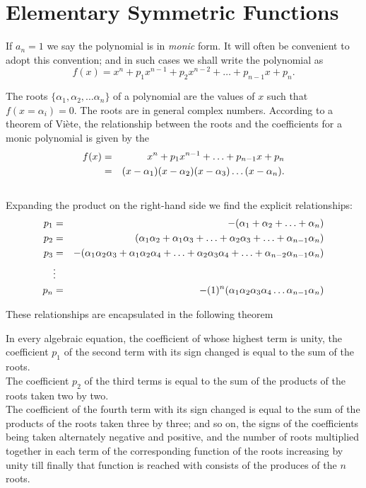 \section{Elementary Symmetric Functions}


If $a_n = 1$ we say the polynomial is in {\it monic} form. It will often be convenient to adopt this convention; and in such cases we shall write the polynomial as 
\[ f(x) = x^n + p_1 x^{n-1} + p_2 x^{n-2} + \hdots + p_{n-1} x + p_n.\]

The roots $\{\alpha_1, \alpha_2, \hdots \alpha_n\}$ of a polynomial are the values of $x$ such that $f(x=\alpha_i) = 0$. The roots are in general complex numbers.
According to a theorem of Vi\`ete, the relationship between the roots and the coefficients for a monic polynomial is given by the 
\begin{eqnarray*}
f(x) &=&   x^n + p_{1} x^{n-1} + \hdots + p_{n-1} x + p_n \cr
  &=& (x - \alpha_1)(x-\alpha_2)(x-\alpha_3) \hdots (x- \alpha_n).
  \end{eqnarray*}\\
  
  Expanding the product on the right-hand side we find the explicit relationships:\\
  
  \begin{eqnarray*}  
  p_1 &=& - (\alpha_1 + \alpha_2 + \hdots + \alpha_n)\cr
  p_2 &=&   (\alpha_1\alpha_2 + \alpha_1\alpha_3 + \hdots + \alpha_2 \alpha_3 +\hdots +\alpha_{n-1} \alpha_n)\cr
  p_3 &=&  -(\alpha_1\alpha_2 \alpha_3 + \alpha_1\alpha_2 \alpha_4 + \hdots + \alpha_2 \alpha_3 \alpha_4 +\hdots +\alpha_{n-2} \alpha_{n-1}\alpha_n)\cr
         &\vdots& \cr 
  p_n &=&  -(1)^n(\alpha_1 \alpha_2 \alpha_3 \alpha_4 \hdots \alpha_{n-1} \alpha_n)
  \end{eqnarray*}

These relationships are encapsulated in the following theorem
\begin{theorem}
In every algebraic equation, the coefficient of whose highest term is unity, the coefficient $p_1$ of the second term with its sign changed is equal to the sum of the roots. \\

The coefficient $p_2$ of the third terms is equal to the sum of the products of the roots taken two by two. \\

The coefficient of the fourth term with its sign changed is equal to the sum of the products of the roots taken three by three; and so on, the signs of the coefficients 
being taken alternately negative and positive, and the number of roots multiplied together in each term of the corresponding function of the roots increasing by unity
till finally that function is reached with consists of the produces of the $n$ roots. 
\end{theorem}

